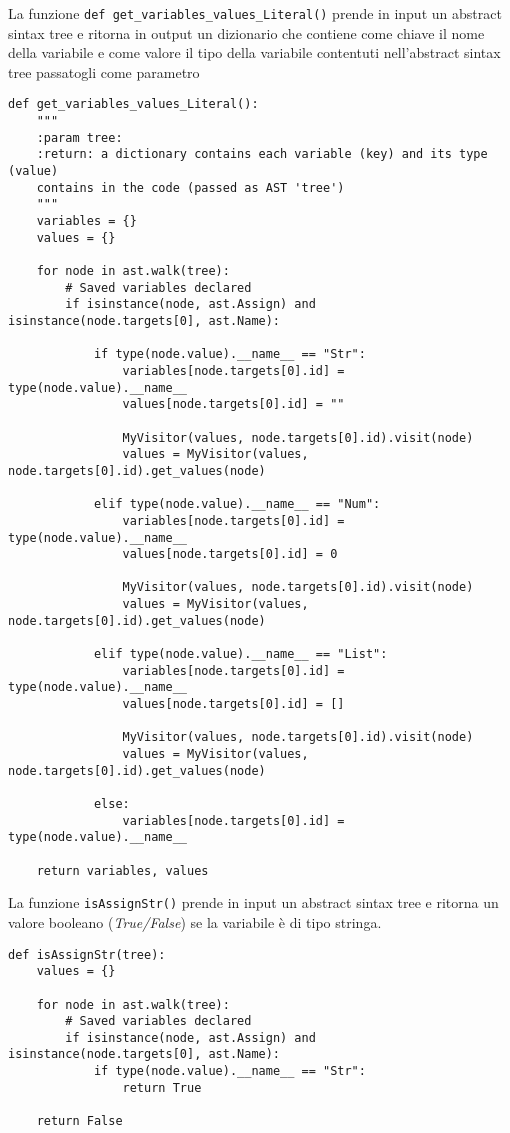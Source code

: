 \documentclass[a4paper,oneside,openright,titlepage,10pt,footinclude,headinclude]{scrbook}
\begin{document}
La funzione \texttt{def get\_variables\_values\_Literal()} prende in input un abstract sintax tree e ritorna in output un dizionario che contiene come chiave il nome della variabile e come valore il tipo della variabile contentuti nell'abstract sintax tree passatogli come parametro

\begin{graybox}[innerleftmargin=2,]
\begin{lstlisting}
def get_variables_values_Literal():
    """
    :param tree:
    :return: a dictionary contains each variable (key) and its type (value) 
    contains in the code (passed as AST 'tree')
    """
    variables = {}
    values = {}

    for node in ast.walk(tree):
        # Saved variables declared
        if isinstance(node, ast.Assign) and isinstance(node.targets[0], ast.Name):

            if type(node.value).__name__ == "Str":
                variables[node.targets[0].id] = type(node.value).__name__
                values[node.targets[0].id] = ""
                
                MyVisitor(values, node.targets[0].id).visit(node)
                values = MyVisitor(values, node.targets[0].id).get_values(node)

            elif type(node.value).__name__ == "Num":
                variables[node.targets[0].id] = type(node.value).__name__
                values[node.targets[0].id] = 0
                
                MyVisitor(values, node.targets[0].id).visit(node)
                values = MyVisitor(values, node.targets[0].id).get_values(node)

            elif type(node.value).__name__ == "List":
                variables[node.targets[0].id] = type(node.value).__name__
                values[node.targets[0].id] = []
                
                MyVisitor(values, node.targets[0].id).visit(node)
                values = MyVisitor(values, node.targets[0].id).get_values(node)

            else:
                variables[node.targets[0].id] = type(node.value).__name__

    return variables, values
\end{lstlisting}
\end{graybox}


La funzione \texttt{isAssignStr()} prende in input un abstract sintax tree e ritorna un valore booleano (\textit{True/False}) se la variabile è di tipo stringa.
\begin{graybox}[innerleftmargin=2,]
\begin{lstlisting}
def isAssignStr(tree):
    values = {}

    for node in ast.walk(tree):
        # Saved variables declared
        if isinstance(node, ast.Assign) and isinstance(node.targets[0], ast.Name):
            if type(node.value).__name__ == "Str":
                return True

    return False
\end{lstlisting}
\end{graybox}
\end{document}
